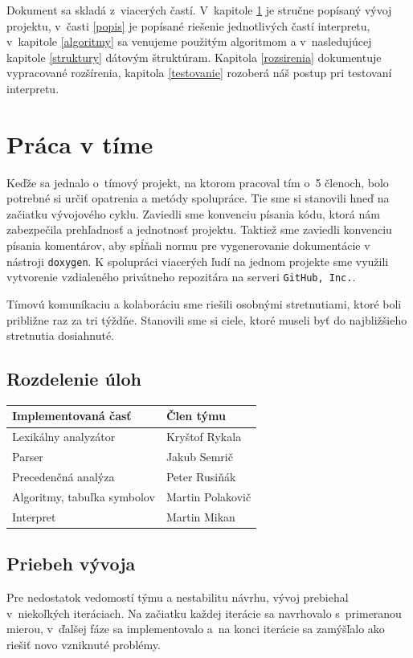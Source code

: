 \documentclass[11pt,a4paper]{article}
\begin{document}
	Dokument sa skladá z~viacerých častí. V~kapitole \ref{tim} je stručne popísaný vývoj projektu, v~časti \ref{popis} je popísané riešenie jednotlivých častí interpretu, v~kapitole \ref{algoritmy} sa venujeme použitým algoritmom a v~nasledujúcej kapitole \ref{struktury} dátovým štruktúram. Kapitola \ref{rozsirenia} dokumentuje vypracované rozšírenia, kapitola \ref{testovanie} rozoberá náš postup pri testovaní interpretu.
	
	
	\section{Práca v tíme}
	\label{tim}
	
	Keďže sa jednalo o~tímový projekt, na ktorom pracoval tím o~5 členoch, bolo potrebné si určiť opatrenia a metódy spolupráce. Tie sme si stanovili hneď na začiatku vývojového cyklu. Zaviedli sme konvenciu písania kódu, ktorá nám zabezpečila prehľadnosť a jednotnosť projektu. Taktiež sme zaviedli konvenciu písania komentárov, aby spĺňali normu pre vygenerovanie dokumentácie v nástroji \texttt{doxygen}. K spolupráci viacerých ľudí na jednom projekte sme využili vytvorenie vzdialeného privátneho repozitára na serveri \texttt{GitHub, Inc.}.
	
	Tímovú komuníkaciu a kolaboráciu sme riešili osobnými stretnutiami, ktoré boli približne raz za tri týždňe. Stanovili sme si ciele, ktoré museli byť do najbližšieho stretnutia dosiahnuté.
	
	\subsection{Rozdelenie úloh}
	\begin{center}
		\begin{tabular}{|l|l|}
			\hline
			\large{\textbf{Implementovaná časť}} & \large{\textbf{Člen týmu}}\\
			\hline
			\hline
			Lexikálny analyzátor & Kryštof Rykala \\
			\hline
			Parser & Jakub Semrič \\
			\hline
			Precedenčná analýza & Peter Rusiňák \\
			\hline
			Algoritmy, tabuľka symbolov & Martin Polakovič \\
			\hline
			Interpret & Martin Mikan \\
			\hline
		\end{tabular}
	\end{center}
	
	\subsection{Priebeh vývoja}
	\label{vyvoj}
	Pre nedostatok vedomostí týmu a nestabilitu návrhu, vývoj prebiehal v~niekoľkých
	iteráciach. Na začiatku každej iterácie sa navrhovalo s~primeranou mierou,
	v~ďalšej fáze sa implementovalo a~na konci iterácie sa zamýšľalo ako riešiť
	novo vzniknuté problémy.
	
\end{document}
